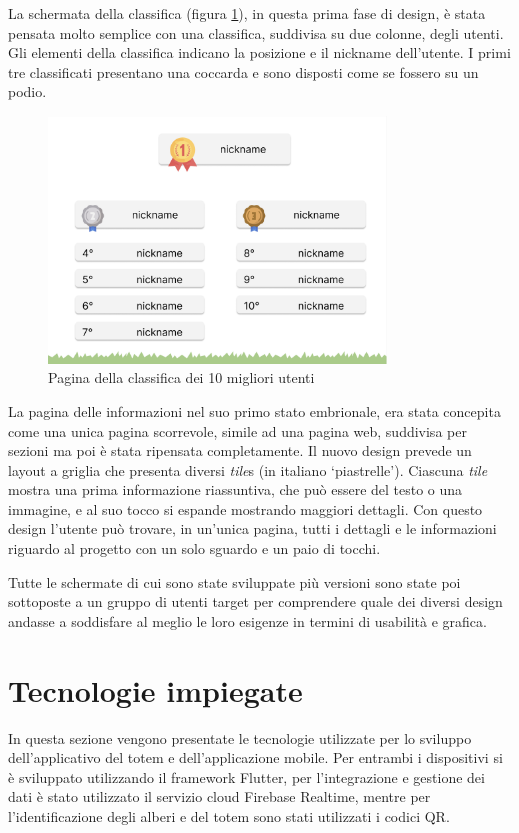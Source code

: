 La schermata della classifica (figura \ref{fig:chartPage}), in questa prima fase di design, è stata pensata molto semplice con una classifica, suddivisa su due colonne, degli utenti. Gli elementi della classifica indicano la posizione e il nickname dell'utente. I primi tre classificati presentano una coccarda e sono disposti come se fossero su un podio.
\begin{figure}
    \centering
    \includegraphics[width=0.8\textwidth]{img/totem/topchartPage.png}
    \caption[Classifica Top10 nel totem]{Pagina della classifica dei 10 migliori utenti}
    \label{fig:chartPage}
\end{figure}

La pagina delle informazioni nel suo primo stato embrionale, era stata concepita come una unica pagina scorrevole, simile ad una pagina web, suddivisa per sezioni ma poi è stata ripensata completamente. Il nuovo design prevede un layout a griglia che presenta diversi \textit{tile}s (in italiano \enquote*{piastrelle}). Ciascuna \textit{tile} mostra una prima informazione riassuntiva, che può essere del testo o una immagine, e al suo tocco si espande mostrando maggiori dettagli. Con questo design l'utente può trovare, in un'unica pagina, tutti i dettagli e le informazioni riguardo al progetto con un solo sguardo e un paio di tocchi.

Tutte le schermate di cui sono state sviluppate più versioni sono state poi sottoposte a un gruppo di utenti target per comprendere quale dei diversi design andasse a soddisfare al meglio le loro esigenze in termini di usabilità e grafica.

%
%
%
\section{Tecnologie impiegate}
In questa sezione vengono presentate le tecnologie utilizzate per lo sviluppo dell'applicativo del totem e dell'applicazione mobile. Per entrambi i dispositivi si è sviluppato utilizzando il framework Flutter, per l'integrazione e gestione dei dati è stato utilizzato il servizio cloud Firebase Realtime, mentre per l'identificazione degli alberi e del totem sono stati utilizzati i codici QR.

